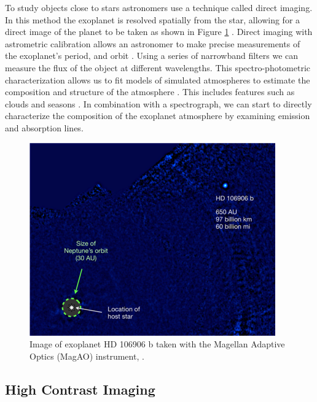  To study objects close to stars astronomers use a technique called direct imaging. In this method the exoplanet is resolved spatially from the star, allowing for a direct image of the planet to be taken as shown in Figure \ref{fig:exoplanets} \citep{bailey2013hd}. Direct imaging with astrometric calibration allows an astronomer to make precise measurements of the exoplanet’s period, and orbit \citep{seager2010exoplanets}. Using a series of narrowband filters we can measure the flux of the object at different wavelengths. This spectro-photometric characterization allows us to fit models of simulated atmospheres to estimate the composition and structure of the atmosphere \citep{morzinski2015magellan}. This includes features such as clouds and seasons \citep{skemer2012first}. In combination with a spectrograph, we can start to directly characterize the composition of the exoplanet atmosphere by examining emission and absorption lines. 
 

\begin{figure}
    \centering
    \includegraphics{Chapter Materials/Introduction Materials/Introduction Figures/HCexoplanet.png}
    \caption{Image of exoplanet HD 106906 b taken with the Magellan Adaptive Optics (MagAO) instrument, \citep{bailey2013hd}.}
    \label{fig:exoplanets}
\end{figure}



\subsection{High Contrast Imaging}

